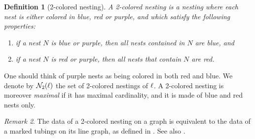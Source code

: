 \documentclass[twoside, 12pt]{amsart}
\newtheorem{definition}{Definition}[section]
\theoremstyle{remark}
\newtheorem{remark}[definition]{\sc Remark}
\begin{document}
\begin{definition}[2-colored nesting] 
A \emph{2-colored nesting} is a nesting where each nest is either colored in blue, red or purple, and which satisfy the following properties: 
\begin{enumerate}[leftmargin=*]
\item if a nest $N$ is blue or purple, then all nests contained in $N$ are blue, and 
\item if a nest $N$ is red or purple, then all nests that contain $N$ are red.
\end{enumerate}
\end{definition}
One should think of purple nests as being colored in both red and blue. 
We denote by $\mathcal{N}_2(\ell)$ the set of 2-colored nestings of $\ell$. 
A 2-colored nesting is moreover \emph{maximal} if it has maximal cardinality, and it is made of blue and red nests only. 

\begin{remark} 
The data of a 2-colored nesting on a graph is equivalent to the data of a marked tubings on its line graph, as defined in \cite{DevadossForcey08}. 
See also \cite[Remark 2.4]{LA21}.
\end{remark}
\end{document}
